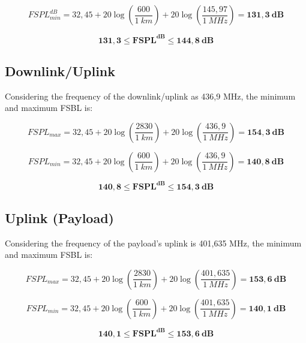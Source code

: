 \begin{equation}
FSPL^{dB}_{min} = 32,45 + 20\log\left(\frac{600}{1\ km}\right) + 20\log\left(\frac{145,97}{1\ MHz}\right) = \mathbf{131,3\ dB}
\end{equation}

\begin{equation}
\mathbf{131,3 \leq FSPL^{dB} \leq 144,8\ dB}
\end{equation}

\subsection{Downlink/Uplink}

Considering the frequency of the downlink/uplink as 436,9 MHz, the minimum and maximum FSBL is:

\begin{equation}
FSPL_{max} = 32,45 + 20\log\left(\frac{2830}{1\ km}\right) + 20\log\left(\frac{436,9}{1\ MHz}\right) = \mathbf{154,3\ dB}
\end{equation}

\begin{equation}
FSPL_{min} = 32,45 + 20\log\left(\frac{600}{1\ km}\right) + 20\log\left(\frac{436,9}{1\ MHz}\right) = \mathbf{140,8\ dB}
\end{equation}

\begin{equation}
    \mathbf{140,8 \leq FSPL^{dB} \leq 154,3\ dB}
\end{equation}

\subsection{Uplink (Payload)}

Considering the frequency of the payload's uplink is 401,635 MHz, the minimum and maximum FSBL is:

\begin{equation}
FSPL_{max} = 32,45 + 20\log\left(\frac{2830}{1\ km}\right) + 20\log\left(\frac{401,635}{1\ MHz}\right) = \mathbf{153,6\ dB}
\end{equation}

\begin{equation}
FSPL_{min} = 32,45 + 20\log\left(\frac{600}{1\ km}\right) + 20\log\left(\frac{401,635}{1\ MHz}\right) = \mathbf{140,1\ dB}
\end{equation}

\begin{equation}
    \mathbf{140,1 \leq FSPL^{dB} \leq 153,6\ dB}
\end{equation}

